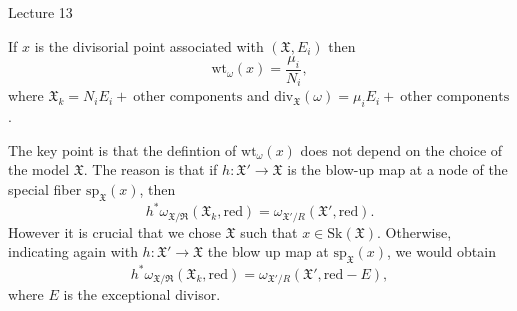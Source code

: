 \begin{section}{Lecture 13}
\begin{example}
 If $x$ is the divisorial point associated with $(\mathfrak{X}, E_i)$ then 
 \[\textrm{wt}_{\omega}(x) = \frac{\mu_i}{N_i}, \]
 where $  \mathfrak{X}_k = N_i E_i + \ \textrm{other components}$ and $\textrm{div}_{\mathfrak{X}}(\omega) = \mu_i E_i + \ \textrm{other components}$.
\end{example}
The key point is that the defintion of  $\textrm{wt}_{\omega}(x)$ does not depend on the choice of the model $\mathfrak{X}$. The reason is that if $h : \mathfrak{X}' \rightarrow \mathfrak{X}$ is the blow-up map at a node of the special fiber $\textrm{sp}_{\mathfrak{X}}(x)$, then 
\[
 h^{*} \omega_{\mathfrak{X/R}}(\mathfrak{X}_k, \textrm{red}) = \omega_{\mathfrak{X}'/R}(\mathfrak{X}', \textrm{red}).
\]
However it is crucial that we chose $\mathfrak{X}$ such that $x \in \textrm{Sk}(\mathfrak{X})$. Otherwise, indicating again with $h: \mathfrak{X}' \rightarrow \mathfrak{X}$ the blow up map at $\textrm{sp}_{\mathfrak{X}}(x)$, we would obtain 
\[
 h^{*} \omega_{\mathfrak{X/R}}(\mathfrak{X}_k, \textrm{red}) = \omega_{\mathfrak{X}'/R}(\mathfrak{X}', \textrm{red}-E),
\]
where $E$ is the exceptional divisor. \\




\end{section}
